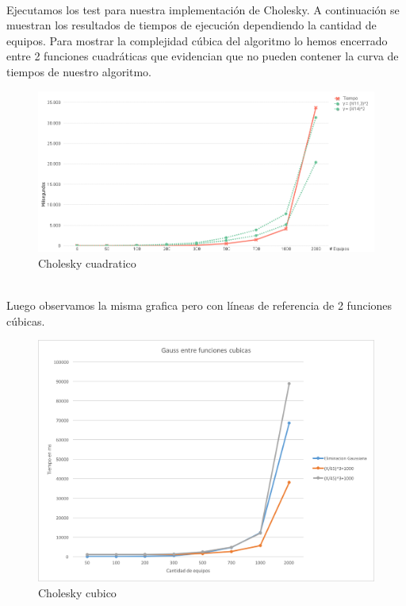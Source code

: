 \\
Ejecutamos los test para nuestra implementación de Cholesky. A continuación se muestran los resultados de tiempos de ejecución dependiendo la cantidad de equipos.
Para mostrar la complejidad cúbica del algoritmo lo hemos encerrado entre 2 funciones cuadráticas que evidencian que no pueden contener la curva de tiempos de nuestro algoritmo.\\


\begin{figure}[H]
    \centering
    \includegraphics[width=1\textwidth]{IMG/cholesky cuadratico.png}
    \caption{Cholesky cuadratico}
    \label{fig:Cholesky cuadratico}
\end{figure}

\\

Luego observamos la misma grafica pero con líneas de referencia de 2 funciones cúbicas.\\

\begin{figure}[H]
    \centering
    \includegraphics[width=1\textwidth]{IMG/gaussEntreCubicas.png}
    \caption{Cholesky cubico}
    \label{fig:Cholesky cubico}
\end{figure}

